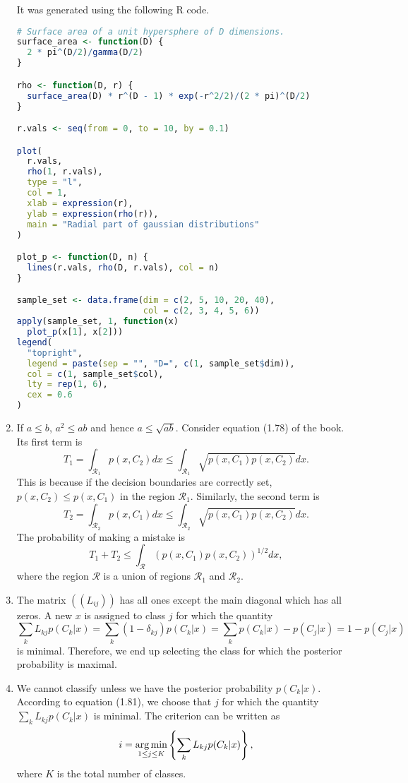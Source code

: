 \begin{enumerate}
It was generated using the following R code.
\begin{lstlisting}[language=R, frame=single]
# Surface area of a unit hypersphere of D dimensions.
surface_area <- function(D) {
  2 * pi^(D/2)/gamma(D/2)
}

rho <- function(D, r) {
  surface_area(D) * r^(D - 1) * exp(-r^2/2)/(2 * pi)^(D/2)
}

r.vals <- seq(from = 0, to = 10, by = 0.1)

plot(
  r.vals,
  rho(1, r.vals),
  type = "l",
  col = 1,
  xlab = expression(r),
  ylab = expression(rho(r)),
  main = "Radial part of gaussian distributions"
)

plot_p <- function(D, n) {
  lines(r.vals, rho(D, r.vals), col = n)
}

sample_set <- data.frame(dim = c(2, 5, 10, 20, 40),
                         col = c(2, 3, 4, 5, 6))
apply(sample_set, 1, function(x)
  plot_p(x[1], x[2]))
legend(
  "topright",
  legend = paste(sep = "", "D=", c(1, sample_set$dim)),
  col = c(1, sample_set$col),
  lty = rep(1, 6),
  cex = 0.6
)

\end{lstlisting}

\item If $a \le b$, $a^2 \le ab$ and hence $a \le \sqrt{ab}$. Consider equation (1.78) of the book.
Its first term is 
\[
T_1 = \int_{\mathcal{R}_1}p(x, C_2)dx \le \int_{\mathcal{R}_1}\sqrt{p(x, C_1)p(x, C_2)}dx.
\]
This is because if the decision boundaries are correctly set, $p(x, C_2) \le p(x, C_1)$ in the region
$\mathcal{R}_1$. Similarly, the second term is
\[
T_2 = \int_{\mathcal{R}_2}p(x, C_1)dx \le \int_{\mathcal{R}_2}\sqrt{p(x, C_1)p(x, C_2)}dx.
\]
The probability of making a mistake is
\[
T_1 + T_2 \le \int_{\mathcal{R}}\left(p(x, C_1)p(x, C_2)\right)^{1/2}dx,
\]
where the region $\mathcal{R}$ is a union of regions $\mathcal{R}_1$ and $\mathcal{R}_2$.

\item The matrix $((L_{ij}))$ has all ones except the main diagonal which has all zeros. A
new $x$ is assigned to class $j$ for which the quantity
\[
\sum_{k}L_{kj}p(C_k|x) = \sum_k (1 - \delta_{kj})p(C_k|x) = \sum_k p(C_k|x) - p(C_j|x) = 1 - p(C_j|x)
\]
is minimal. Therefore, we end up selecting the class for which the posterior probability
is maximal.

\item We cannot classify unless we have the posterior probability $p(C_k|x)$. According to equation
(1.81), we choose that $j$ for which the quantity $\sum_k L_{kj}p(C_k|x)$ is minimal. The 
criterion can be written as
\[
i = \operatorname*{arg\,min}_{1 \le j \le K}\left\{\sum_k L_{kj}p(C_k|x)\right\},
\]
where $K$ is the total number of classes.


\end{enumerate}
